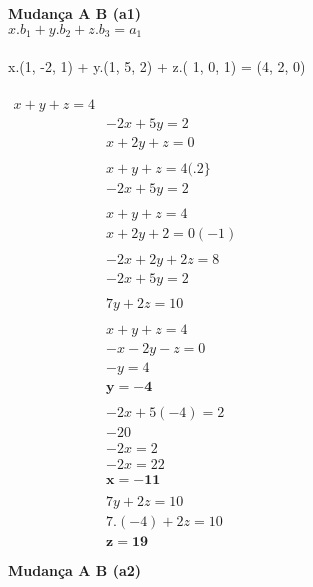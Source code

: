 \documentclass{article}
\begin{document}
\\\\
\textbf{Mudança A \rightarrow B (a1)
\\$x. b_1 + y. b_2 + z. b_3 = a_1 $\\\\}
x.(1, -2, 1) + y.(1, 5, 2) + z.( 1, 0, 1) = (4, 2, 0) \\\\
$\begin{align}
x+y+z=4 \\&
-2 x+5 y=2 \\&
x+2 y+z=0 \\\\&
x+y+z=4(.2\} \\&
-2 x+5 y=2 \\\\&
x+y+z=4 \\&
x+2 y+2=0 (-1)\\\\&
-2 x+2 y+2 z=8 \\&
-2 x+5 y=2 \\\\&
7 y+2 z=10 \\\\&
x+y+z=4 \\&
-x-2 y-z=0 \\&
-y=4 \\&
\mathbf{y=-4} \\\\&
-2 x+5(-4)=2 \\&
-20 \\&
-2 x=2 \\&
-2 x = 22\\&
\mathbf{x = -11}\\\\&
7y + 2z = 10\\&
7.(-4)+ 2z = 10\\&
\mathbf{z = 19}\\\\&
\end{align}$
\\
\textbf{Mudança A \rightarrow B (a2)}\\\\
\end{document}

